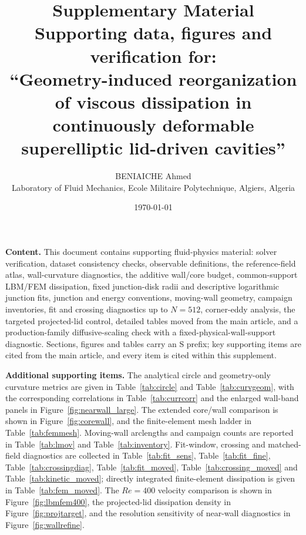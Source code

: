 \documentclass[11pt]{article}
\title{\bfseries Supplementary Material\\[6pt]
\large Supporting data, figures and verification for:\\
``Geometry-induced reorganization of viscous dissipation in continuously deformable superelliptic lid-driven cavities''}
\author{BENIAICHE Ahmed\\[2pt]
\small Laboratory of Fluid Mechanics, Ecole Militaire Polytechnique, Algiers, Algeria}
\date{\today}
\begin{document}
\par
{}\par\bigskip

\maketitle

\noindent\textbf{Content.} This document contains supporting fluid-physics material: solver verification, dataset consistency checks, observable definitions, the reference-field atlas, wall-curvature diagnostics, the additive wall/core budget, common-support LBM/FEM dissipation, fixed junction-disk radii and descriptive logarithmic junction fits, junction and energy conventions, moving-wall geometry, campaign inventories, fit and crossing diagnostics up to $N=512$, corner-eddy analysis, the targeted projected-lid control, detailed tables moved from the main article, and a production-family diffusive-scaling check with a fixed-physical-wall-support diagnostic. Sections, figures and tables carry an S prefix; key supporting items are cited from the main article, and every item is cited within this supplement.

\noindent\textbf{Additional supporting items.} The analytical circle and geometry-only curvature metrics are given in Table~\ref{tab:circle} and Table~\ref{tab:curvgeom}, with the corresponding correlations in Table~\ref{tab:currcorr} and the enlarged wall-band panels in Figure~\ref{fig:nearwall_large}. The extended core/wall comparison is shown in Figure~\ref{fig:corewall}, and the finite-element mesh ladder in Table~\ref{tab:femmesh}. Moving-wall arclengths and campaign counts are reported in Table~\ref{tab:lmov} and Table~\ref{tab:inventory}. Fit-window, crossing and matched-field diagnostics are collected in Table~\ref{tab:fit_sens}, Table~\ref{tab:fit_fine}, Table~\ref{tab:crossingdiag}, Table~\ref{tab:fit_moved}, Table~\ref{tab:crossing_moved} and Table~\ref{tab:kinetic_moved}; directly integrated finite-element dissipation is given in Table~\ref{tab:fem_moved}. The $Re=400$ velocity comparison is shown in Figure~\ref{fig:lbmfem400}, the projected-lid dissipation density in Figure~\ref{fig:projtarget}, and the resolution sensitivity of near-wall diagnostics in Figure~\ref{fig:wallrefine}.
\end{document}
